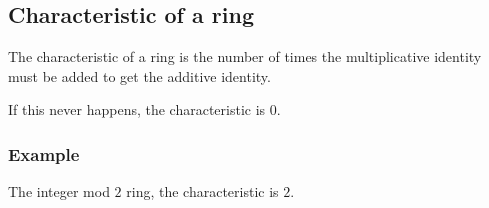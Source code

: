 
\subsection{Characteristic of a ring}

The characteristic of a ring is the number of times the multiplicative identity must be added to get the additive identity.

If this never happens, the characteristic is \(0\).

\subsubsection{Example}

The integer mod \(2\) ring, the characteristic is \(2\).

